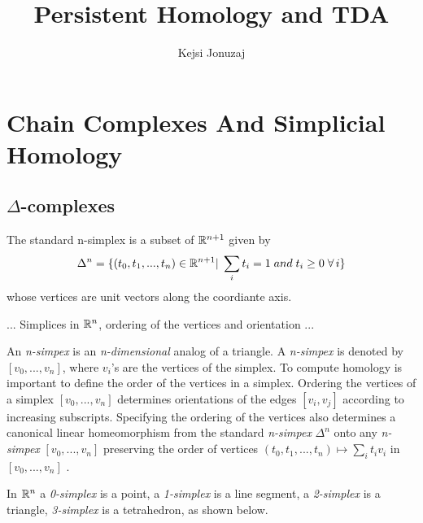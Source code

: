 \documentclass[11pt,a4paper]{report}
\author{Kejsi Jonuzaj}
\title{Persistent Homology and TDA}
\begin{document}
\maketitle
\setcounter{tocdepth}{1}
\tableofcontents


      \chapter{Chain Complexes And Simplicial Homology}

	      \section{$\Delta$-complexes}
		   
            \begin{defn}
			    \label {n-simplex} The standard n-simplex is a subset of $\mathbb{R}^{n+1}$ given by 
			    \[
			     \Delta^n = \{(t_0, t_1, ... , t_n) \in \mathbb{R}^{n+1} 
			     | \; \sum\limits_i t_i = 1 \; and \; t_i \geq 0 \; \forall \, i \}
			    \]
             \cite [103] {hatcher}
              whose vertices are unit vectors along the coordiante axis. 
		      \end{defn}
		      
		      ...
		      Simplices in $\mathbb{R}^n$, ordering of the vertices and orientation
		      ... 
		      
		      An \emph{n-simpex} is an \emph{n-dimensional} analog of a triangle.
		      A \emph{n-simpex} is denoted by $ [v_0,... , v_n] $, where $ v_i $'s are 
		      the vertices of the simplex. To compute homology is important to
		      define the order of the vertices in a simplex. 
              Ordering the vertices of a simplex $ [v_0,... , v_n] $ 
              determines orientations of the edges $[v_i, v_j]$ according to increasing subscripts.
              Specifying the ordering of the vertices also determines
              a canonical linear homeomorphism from the standard \emph{n-simpex} 
              $\Delta^n$ onto any \emph{n-simpex} $ [v_0,... , v_n] $ preserving 
              the order of vertices $(t_0, t_1, ... , t_n) 
              \mapsto \sum\limits_i t_i v_i$ in $ [v_0,... , v_n] $ \cite [103] {hatcher}. 
		      
		      In $\mathbb{R}^n$ a \emph{0-simplex} is a point, a \emph{1-simplex} is a line segment, a \emph{2-simplex} is a triangle, \emph{3-simplex} is a tetrahedron, as shown below. \\
		      
\end{document}
